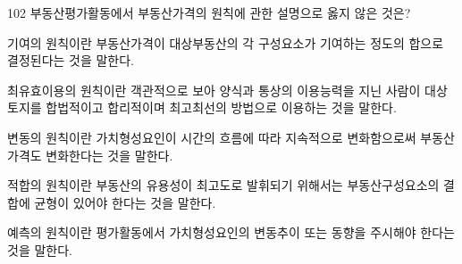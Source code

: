 \begin{question}{102}
부동산평가활동에서 부동산가격의 원칙에 관한 설명으로 옳지 않은 것은?
\begin{choices}
  \item 기여의 원칙이란 부동산가격이 대상부동산의 각 구성요소가 기여하는 정도의 합으로 결정된다는 것을 말한다.
  \item 최유효이용의 원칙이란 객관적으로 보아 양식과 통상의 이용능력을 지닌 사람이 대상토지를 합법적이고 합리적이며 최고최선의 방법으로 이용하는 것을 말한다.
  \item 변동의 원칙이란 가치형성요인이 시간의 흐름에 따라 지속적으로 변화함으로써 부동산가격도 변화한다는 것을 말한다.
  \item 적합의 원칙이란 부동산의 유용성이 최고도로 발휘되기 위해서는 부동산구성요소의 결합에 균형이 있어야 한다는 것을 말한다.
  \item 예측의 원칙이란 평가활동에서 가치형성요인의 변동추이 또는 동향을 주시해야 한다는 것을 말한다.
\end{choices}
\end{question}
